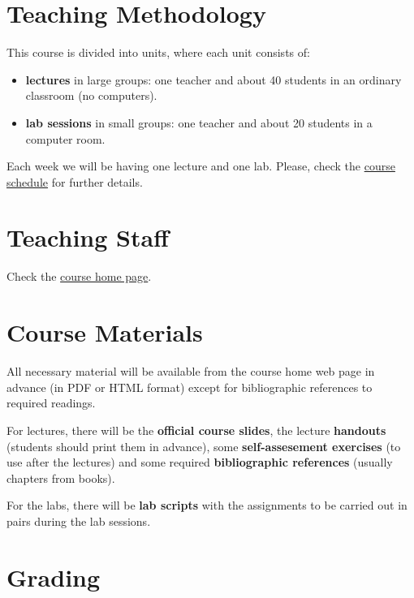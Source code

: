 \documentclass[11pt, a4paper, twoside]{article}
\begin{document}
\section{Teaching Methodology}

This course is divided into units, where each unit consists of:

\begin{itemize}

  \item \textbf{lectures} in large groups: one teacher and about 40 students in
    an ordinary classroom (no computers).

  \item \textbf{lab sessions} in small groups: one teacher and about 20
    students in a computer room.

\end{itemize}

Each week we will be having one lecture and one lab. Please, check the
\href{http://www.it.uc3m.es/alcortes/asig/1415/ps-ging/schedule.pdf}{course
schedule} for further details.

\section{Teaching Staff}

Check the
\href{http://it.uc3m.es/alcortes/asig/1415/ps-ging/index.html}{course home
page}.

\section{Course Materials}

All necessary material will be available from the course home web page in
advance (in PDF or HTML format) except for bibliographic references to required
readings.

For lectures, there will be the \textbf{official course slides}, the lecture
\textbf{handouts} (students should print them in advance), some
\textbf{self-assesement exercises} (to use after the lectures) and some
required \textbf{bibliographic references} (usually chapters from books).

For the labs, there will be \textbf{lab scripts} with the assignments to be
carried out in pairs during the lab sessions.


\section{Grading}
\end{document}
